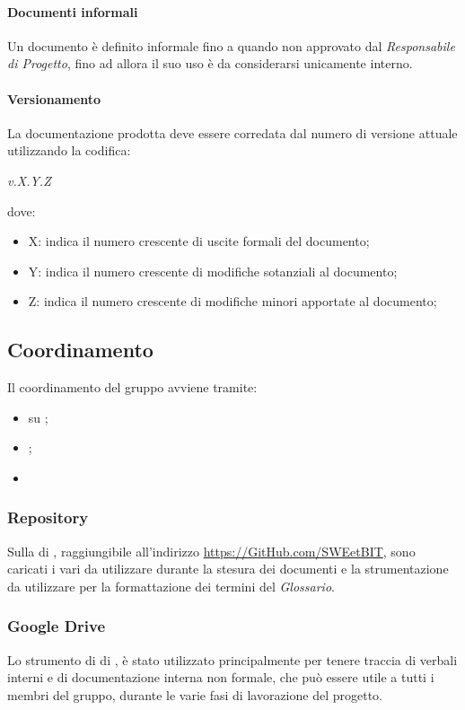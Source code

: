       \paragraph{Documenti informali}
        Un documento è definito informale fino a quando non approvato dal \emph{Responsabile di Progetto}, fino ad allora il suo uso è da considerarsi unicamente interno.
      \paragraph{Versionamento}
        La documentazione prodotta deve essere corredata dal numero di versione attuale utilizzando la codifica:
        \begin{center}
          \emph{v.X.Y.Z}
        \end{center}
        dove:
        \begin{itemize}
          \item X: indica il numero crescente di uscite formali del documento;
          \item Y: indica il numero crescente di modifiche sotanziali al documento;
          \item Z: indica il numero crescente di modifiche minori apportate al documento;
        \end{itemize}

\subsection{Coordinamento}
    Il coordinamento del gruppo avviene tramite:
    \begin{itemize}
      \item {} su \textbf{};
      \item {};
      \item {}
    \end{itemize}
    \subsubsection{Repository}
      Sulla  di \textbf{}, raggiungibile all'indirizzo \url{https://GitHub.com/SWEetBIT}, sono caricati i vari  da utilizzare
      durante la stesura dei documenti e la strumentazione da utilizzare per la formattazione dei termini del \emph{Glossario}.

\subsubsection{Google Drive}
      Lo strumento di  di , è stato utilizzato principalmente per tenere traccia di verbali interni e di documentazione interna
      non formale, che può essere utile a tutti i membri del gruppo, durante le varie fasi di lavorazione del progetto.
       
